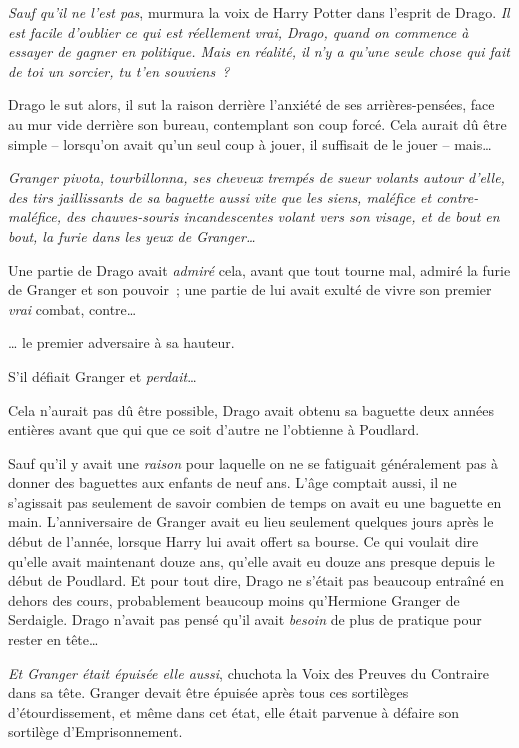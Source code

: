 \emph{Sauf qu'il ne l'est pas}, murmura la voix de Harry Potter dans l'esprit de Drago.
\emph{Il est facile d'oublier ce qui est réellement vrai, Drago, quand on commence à essayer de gagner en politique.
Mais en réalité, il n'y a qu'une seule chose qui fait de toi un sorcier, tu t'en souviens~?}

Drago le sut alors, il sut la raison derrière l'anxiété de ses arrières-pensées, face au mur vide derrière son bureau, contemplant son coup forcé.
Cela aurait dû être simple -- lorsqu'on avait qu'un seul coup à jouer, il suffisait de le jouer -- mais…

\emph{Granger pivota, tourbillonna, ses cheveux trempés de sueur volants autour d'elle, des tirs jaillissants de sa baguette aussi vite que les siens, maléfice et contre-maléfice, des chauves-souris incandescentes volant vers son visage, et de bout en bout, la furie dans les yeux de Granger…}

Une partie de Drago avait \emph{admiré} cela, avant que tout tourne mal, admiré la furie de Granger et son pouvoir~; une partie de lui avait exulté de vivre son premier \emph{vrai} combat, contre…

… le premier adversaire à sa hauteur.

S'il défiait Granger et \emph{perdait}…

Cela n'aurait pas dû être possible, Drago avait obtenu sa baguette deux années entières avant que qui que ce soit d'autre ne l'obtienne à Poudlard.

Sauf qu'il y avait une \emph{raison} pour laquelle on ne se fatiguait généralement pas à donner des baguettes aux enfants de neuf ans.
L'âge comptait aussi, il ne s'agissait pas seulement de savoir combien de temps on avait eu une baguette en main.
L'anniversaire de Granger avait eu lieu seulement quelques jours après le début de l'année, lorsque Harry lui avait offert sa bourse.
Ce qui voulait dire qu'elle avait maintenant douze ans, qu'elle avait eu douze ans presque depuis le début de Poudlard.
Et pour tout dire, Drago ne s'était pas beaucoup entraîné en dehors des cours, probablement beaucoup moins qu'Hermione Granger de Serdaigle.
Drago n'avait pas pensé qu'il avait \emph{besoin} de plus de pratique pour rester en tête…

\emph{Et Granger était épuisée elle aussi}, chuchota la Voix des Preuves du Contraire dans sa tête.
Granger devait être épuisée après tous ces sortilèges d'étourdissement, et même dans cet état, elle était parvenue à défaire son sortilège d'Emprisonnement.

